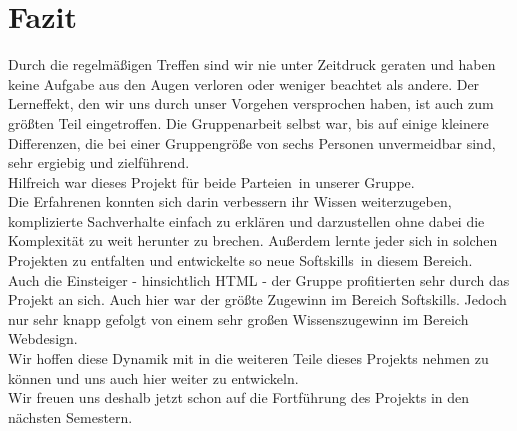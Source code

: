 \documentclass[12pt,a4paper]{article}
\begin{document}
\section{Fazit}
Durch die regelmäßigen Treffen sind wir nie unter Zeitdruck geraten und haben keine Aufgabe aus den Augen verloren oder weniger beachtet als andere. Der Lerneffekt, den wir uns durch unser Vorgehen versprochen haben, ist auch zum größten Teil eingetroffen.
Die Gruppenarbeit selbst war, bis auf einige kleinere Differenzen, die bei einer Gruppengröße von sechs Personen unvermeidbar sind, sehr ergiebig und zielführend.\\
Hilfreich war dieses Projekt für beide \dq Parteien\dq \ in unserer Gruppe.\\
Die Erfahrenen konnten sich darin verbessern ihr Wissen weiterzugeben, komplizierte Sachverhalte einfach zu erklären und darzustellen ohne dabei die Komplexität zu weit herunter zu brechen. Außerdem lernte jeder sich in solchen Projekten zu entfalten und entwickelte so neue \dq Softskills\dq \ in diesem Bereich.\\
Auch die Einsteiger - hinsichtlich HTML - der Gruppe profitierten sehr durch das Projekt an sich. Auch hier war der größte Zugewinn im Bereich \dq Softskills\dq . Jedoch nur sehr knapp gefolgt von einem sehr großen Wissenszugewinn im Bereich Webdesign.\\
Wir hoffen diese Dynamik mit in die weiteren Teile dieses Projekts nehmen zu können und uns auch hier weiter zu entwickeln.\\
Wir freuen uns deshalb jetzt schon auf die Fortführung des Projekts in den nächsten Semestern.
\end{document}

